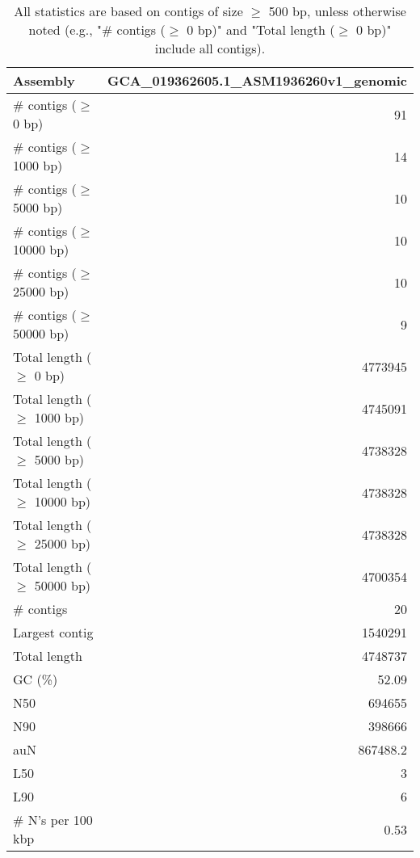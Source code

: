 \documentclass[12pt,a4paper]{article}
\begin{document}
\begin{table}[ht]
\begin{center}
\caption{All statistics are based on contigs of size $\geq$ 500 bp, unless otherwise noted (e.g., "\# contigs ($\geq$ 0 bp)" and "Total length ($\geq$ 0 bp)" include all contigs).}
\begin{tabular}{|l*{1}{|r}|}
\hline
Assembly & GCA\_019362605.1\_ASM1936260v1\_genomic \\ \hline
\# contigs ($\geq$ 0 bp) & 91 \\ \hline
\# contigs ($\geq$ 1000 bp) & 14 \\ \hline
\# contigs ($\geq$ 5000 bp) & 10 \\ \hline
\# contigs ($\geq$ 10000 bp) & 10 \\ \hline
\# contigs ($\geq$ 25000 bp) & 10 \\ \hline
\# contigs ($\geq$ 50000 bp) & 9 \\ \hline
Total length ($\geq$ 0 bp) & 4773945 \\ \hline
Total length ($\geq$ 1000 bp) & 4745091 \\ \hline
Total length ($\geq$ 5000 bp) & 4738328 \\ \hline
Total length ($\geq$ 10000 bp) & 4738328 \\ \hline
Total length ($\geq$ 25000 bp) & 4738328 \\ \hline
Total length ($\geq$ 50000 bp) & 4700354 \\ \hline
\# contigs & 20 \\ \hline
Largest contig & 1540291 \\ \hline
Total length & 4748737 \\ \hline
GC (\%) & 52.09 \\ \hline
N50 & 694655 \\ \hline
N90 & 398666 \\ \hline
auN & 867488.2 \\ \hline
L50 & 3 \\ \hline
L90 & 6 \\ \hline
\# N's per 100 kbp & 0.53 \\ \hline
\end{tabular}
\end{center}
\end{table}
\end{document}

